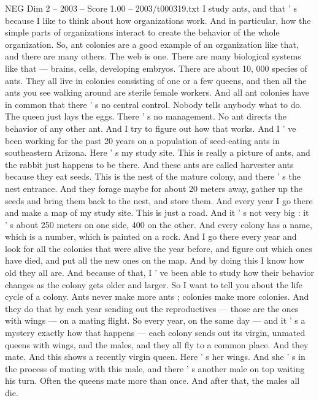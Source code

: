 \begin{textsample}{NEG Dim 2 – 2003 – Score 1.00 – 2003/t000319.txt}  \label{ex:f2_neg_018}
I study ants, and that ' s because I like to think about how organizations work.
And in particular, how the simple parts of organizations interact to create the behavior of the whole organization.
So, ant colonies are a good example of an organization like that, and there are many others.
The web is one.
There are many biological systems like that — brains, cells, developing embryos.
There are about 10, 000 species of ants.
They all live in colonies consisting of one or a few queens, and then all the ants you see walking around are sterile female workers.
And all ant colonies have in common that there ' s no central control.
Nobody tells anybody what to do.
The queen just lays the eggs.
There ' s no management.
No ant directs the behavior of any other ant.
And I try to figure out how that works.
And I ' ve been working for the past 20 years on a population of seed-eating ants in southeastern Arizona.
Here ' s my study site.
This is really a picture of ants, and the rabbit just happens to be there.
And these ants are called harvester ants because they eat seeds.
This is the nest of the mature colony, and there ' s the nest entrance.
And they forage maybe for about 20 meters away, gather up the seeds and bring them back to the nest, and store them.
And every year I go there and make a map of my study site.
This is just a road.
And it ' s not very big : it ' s about 250 meters on one side, 400 on the other.
And every colony has a name, which is a number, which is painted on a rock.
And I go there every year and look for all the colonies that were alive the year before, and figure out which ones have died, and put all the new ones on the map.
And by doing this I know how old they all are.
And because of that, I ' ve been able to study how their behavior changes as the colony gets older and larger.
So I want to tell you about the life cycle of a colony.
Ants never make more ants ; colonies make more colonies.
And they do that by each year sending out the reproductives — those are the ones with wings — on a mating flight.
So every year, on the same day — and it ' s a mystery exactly how that happens — each colony sends out its virgin, unmated queens with wings, and the males, and they all fly to a common place.
And they mate.
And this shows a recently virgin queen.
Here ' s her wings.
And she ' s in the process of mating with this male, and there ' s another male on top waiting his turn.
Often the queens mate more than once.
And after that, the males all die.

\end{textsample}
